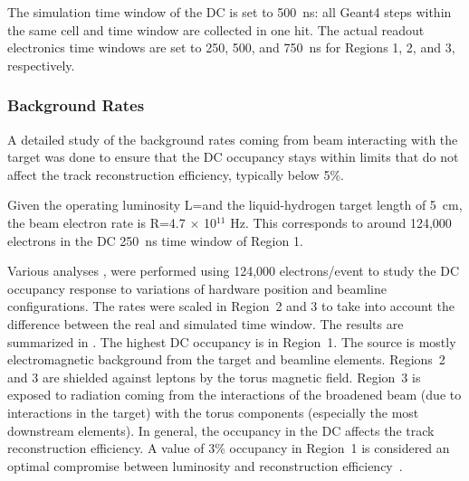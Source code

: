 The simulation time window of the DC is set to 500~ns: all Geant4 steps within the same cell and time window are
collected in one hit. The actual readout electronics time windows are set to 250, 500, and 750~ns for Regions 1, 2, and
3, respectively.

\subsubsection{Background Rates}

A detailed study of the background rates coming from beam interacting with the target was done to ensure that
the DC occupancy stays within limits that do not affect the track reconstruction efficiency, typically below 5\%.

Given the operating luminosity L=\cLuminosity and the liquid-hydrogen target length of 5~cm, the beam electron rate
is R=4.7 $\times$ 10$^{11}$ Hz. This corresponds to around 124,000 electrons in the DC 250~ns time window of Region 1.

Various analyses \cite{targetStudy, clas12Beamline, clas12Background}, were performed using 124,000 electrons/event
to study the DC occupancy response to variations of hardware position and beamline configurations. The rates were scaled
in Region~2 and 3 to take into account the difference between the real and simulated time window. The results are
summarized in . The highest DC occupancy is in Region~1. The source is mostly electromagnetic background
from the target and beamline elements. Regions~2 and 3 are shielded against leptons by the torus magnetic field.
Region~3 is exposed to radiation coming from the interactions of the broadened beam (due to interactions in the target)
with the torus components (especially the most downstream elements). In general, the occupancy in the DC affects the
track reconstruction efficiency. A value of 3\% occupancy in Region~1 is considered an optimal compromise between
luminosity and reconstruction efficiency~\cite{recon-nim}.

